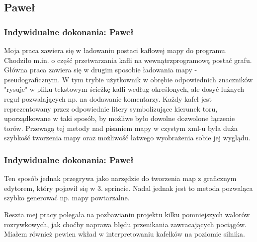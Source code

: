 \documentclass[a4paper, 11pt]{beamer}
\begin{document}
\subsection{Paweł}
\begin{frame}
\frametitle{Indywidualne dokonania: Paweł}
Moja praca zawiera się w ładowaniu postaci kaflowej mapy do programu.
Chodziło m.in. o część przetwarzania kafli na wewnątrzprogramową postać grafu.
Główna praca zawiera się w drugim sposobie ładowania mapy - pseudograficznym.
W tym trybie użytkownik w obrębie odpowiednich znaczników "rysuje" w pliku tekstowym ścieżkę kafli według określonych, ale dosyć luźnych reguł pozwalających np. na dodawanie komentarzy.
Każdy kafel jest reprezentowany przez odpowiednie litery symbolizujące kierunek toru, uporządkowane w taki sposób, by możliwe było dowolne dozwolone łączenie torów.
Przewagą tej metody nad pisaniem mapy w czystym xml-u była duża szybkość tworzenia mapy oraz możliwość łatwego wyobrażenia sobie jej wyglądu.
\end{frame}
\begin{frame}
\frametitle{Indywidualne dokonania: Paweł}
Ten sposób jednak przegrywa jako narzędzie do tworzenia map z graficznym edytorem, który pojawił się w 3. sprincie.
Nadal jednak jest to metoda pozwaląca szybko generować np. mapy powtarzalne.

Reszta mej pracy polegała na pozbawianiu projektu kilku pomniejszych walorów rozrywkowych, jak choćby naprawa błędu przenikania zawracających pociągów. Miałem również pewien wkład w interpretowaniu kafelków na poziomie silnika.
\end{frame}
\end{document}
